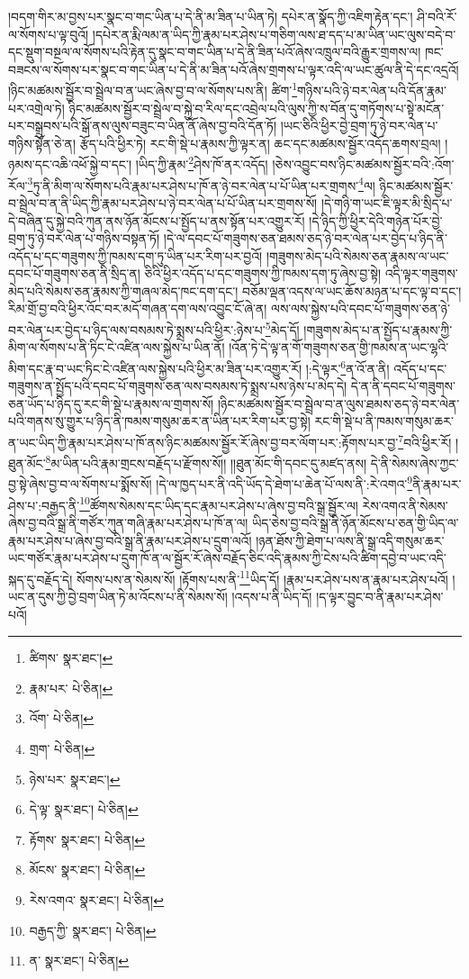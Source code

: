 །བདག་གིར་མ་བྱས་པར་སྣང་བ་གང་ཡིན་པ་དེ་ནི་མ་ཟིན་པ་ཡིན་ཏེ། དཔེར་ན་སྣོད་ཀྱི་འཇིག་རྟེན་དང་། ཤི་བའི་རོ་ལ་སོགས་པ་ལྟ་བུའོ། །དཔེར་ན་རྨི་ལམ་ན་ཡིད་ཀྱི་རྣམ་པར་ཤེས་པ་གཅིག་ལས་ཐ་དད་པ་མ་ཡིན་ཡང་ལུས་བདེ་བ་དང་སྡུག་བསྔལ་ལ་སོགས་པའི་རྟེན་དུ་སྣང་བ་གང་ཡིན་པ་དེ་ནི་ཟིན་པའོ་ཞེས་འཁྲུལ་བའི་རྒྱུར་གྲགས་ལ། ཁང་བཟངས་ལ་སོགས་པར་སྣང་བ་གང་ཡིན་པ་དེ་ནི་མ་ཟིན་པའོ་ཞེས་གྲགས་པ་ལྟར་འདི་ལ་ཡང་ཚུལ་ནི་དེ་དང་འདྲའོ། །ཉིང་མཚམས་སྦྱོར་བ་སྦྲེལ་བ་ན་ཡང་ཞེས་བྱ་བ་ལ་སོགས་པས་ནི། ཚིག་\footnote{ཚིགས་  སྣར་ཐང་། }གཉིས་པའི་ཉེ་བར་ལེན་པའི་དོན་རྣམ་པར་འགྲེལ་ཏེ། ཉིང་མཚམས་སྦྱོར་བ་སྦྲེལ་བ་སྐྱེ་བ་རིལ་དང་འབྲེལ་པའི་ལུས་ཀྱི་ས་བོན་དུ་གཏོགས་པ་སྟེ་མངོན་པར་བསྒྲུབས་པའི་སྒོ་ནས་ལུས་བཟུང་བ་ཡིན་ནོ་ཞེས་བྱ་བའི་དོན་ཏོ། །ཡང་ཅིའི་ཕྱིར་བྱེ་བྲག་ཏུ་ཉེ་བར་ལེན་པ་གཉིས་སྟོན་ཅེ་ན། རྩོད་པའི་ཕྱིར་ཏེ། རང་གི་སྡེ་པ་རྣམས་ཀྱི་ལྟར་ན། ཆང་དང་མཚམས་སྦྱོར་འདོད་ཆགས་བྲལ། །ཉམས་དང་འཆི་འཕོ་སྐྱེ་བ་དང་། །ཡིད་ཀྱི་རྣམ་\footnote{རྣམ་པར་  པེ་ཅིན། }ཤེས་ཁོ་ནར་འདོད། །ཅེས་འབྱུང་བས་ཉིང་མཚམས་སྦྱོར་བའི་:འོག་རོལ་\footnote{འོག་  པེ་ཅིན། }ཏུ་ནི་མིག་ལ་སོགས་པའི་རྣམ་པར་ཤེས་པ་ཁོ་ན་ཉེ་བར་ལེན་པ་པོ་ཡིན་པར་གྲགས་\footnote{གྲག་  པེ་ཅིན། }ལ། ཉིང་མཚམས་སྦྱོར་བ་སྦྲེལ་བ་ན་ནི་ཡིད་ཀྱི་རྣམ་པར་ཤེས་པ་ཉེ་བར་ལེན་པ་པོ་ཡིན་པར་གྲགས་སོ། །དེ་གཉི་ག་ཡང་ཇི་ལྟར་མི་སྲིད་པ་དེ་བཞིན་དུ་སྐྱེ་བའི་ཀུན་ནས་ཉོན་མོངས་པ་སྤྱོད་པ་ནས་སྟོན་པར་འགྱུར་རོ། །དེ་ཉིད་ཀྱི་ཕྱིར་དེའི་གཉེན་པོར་བྱེ་བྲག་ཏུ་ཉེ་བར་ལེན་པ་གཉིས་བསྟན་ཏོ། །དེ་ལ་དབང་པོ་གཟུགས་ཅན་ཐམས་ཅད་ཉེ་བར་ལེན་པར་བྱེད་པ་ཉིད་ནི་འདོད་པ་དང་གཟུགས་ཀྱི་ཁམས་དག་ཏུ་ཡིན་པར་རིག་པར་བྱའོ། །གཟུགས་མེད་པའི་སེམས་ཅན་རྣམས་ལ་ཡང་དབང་པོ་གཟུགས་ཅན་ནི་སྲིད་ན། ཅིའི་ཕྱིར་འདོད་པ་དང་གཟུགས་ཀྱི་ཁམས་དག་ཏུ་ཞེས་བྱ་སྟེ། འདི་ལྟར་གཟུགས་མེད་པའི་སེམས་ཅན་རྣམས་ཀྱི་གཞལ་མེད་ཁང་དག་དང་། བཅོམ་ལྡན་འདས་ལ་ཡང་ཆོས་མཉན་པ་དང་ལྟ་བ་དང་། རིམ་གྲོ་བྱ་བའི་ཕྱིར་འོང་བར་མདོ་གཞན་དག་ལས་འབྱུང་ངོ་ཞེ་ན། ལས་ལས་སྐྱེས་པའི་དབང་པོ་གཟུགས་ཅན་ཉེ་བར་ལེན་པར་བྱེད་པ་ཉིད་ལས་བསམས་ཏེ་སྨྲས་པའི་ཕྱིར་:ཉེས་པ་\footnote{ཉེས་པར་  སྣར་ཐང་། }མེད་དོ། །གཟུགས་མེད་པ་ན་སྤྱོད་པ་རྣམས་ཀྱི་མིག་ལ་སོགས་པ་ནི་ཏིང་ངེ་འཛིན་ལས་སྐྱེས་པ་ཡིན་ནོ། །འོན་ཏེ་དེ་ལྟ་ན་གོ་གཟུགས་ཅན་གྱི་ཁམས་ན་ཡང་ལྷའི་མིག་དང་རྣ་བ་ཡང་ཏིང་ངེ་འཛིན་ལས་སྐྱེས་པའི་ཕྱིར་མ་ཟིན་པར་འགྱུར་རོ། །:དེ་ལྟར་\footnote{དེ་ལྟ་  སྣར་ཐང་།  པེ་ཅིན། }ན་འོ་ན་ནི། འདོད་པ་དང་གཟུགས་ན་སྤྱོད་པའི་དབང་པོ་གཟུགས་ཅན་ལས་བསམས་ཏེ་སྨྲས་པས་ཉེས་པ་མེད་དེ། དེ་ན་ནི་དབང་པོ་གཟུགས་ཅན་ཡོད་པ་ཉིད་དུ་རང་གི་སྡེ་པ་རྣམས་ལ་གྲགས་སོ། །ཉིང་མཚམས་སྦྱོར་བ་སྦྲེལ་བ་ན་ལུས་ཐམས་ཅད་ཉེ་བར་ལེན་པའི་གནས་སུ་གྱུར་པ་ཉིད་ནི་ཁམས་གསུམ་ཆར་ན་ཡིན་པར་རིག་པར་བྱ་སྟེ། རང་གི་སྡེ་པ་ནི་ཁམས་གསུམ་ཆར་ན་ཡང་ཡིད་ཀྱི་རྣམ་པར་ཤེས་པ་ཁོ་ནས་ཉིང་མཚམས་སྦྱོར་རོ་ཞེས་བྱ་བར་ལོག་པར་:རྟོགས་པར་བྱ་\footnote{རྟོགས་  སྣར་ཐང་།  པེ་ཅིན། }བའི་ཕྱིར་རོ། །ཐུན་མོང་\footnote{མོངས་  སྣར་ཐང་།  པེ་ཅིན། }མ་ཡིན་པའི་རྣམ་གྲངས་བརྗོད་པ་རྫོགས་སོ།། །།ཐུན་མོང་གི་དབང་དུ་མཛད་ནས། དེ་ནི་སེམས་ཞེས་ཀྱང་བྱ་སྟེ་ཞེས་བྱ་བ་ལ་སོགས་པ་སྨོས་སོ། །དེ་ལ་ཁྱད་པར་ནི་འདི་ཡོད་དེ་ཐེག་པ་ཆེན་པོ་ལས་ནི་:རེ་འགའ་\footnote{རེས་འགའ་  སྣར་ཐང་།  པེ་ཅིན། }ནི་རྣམ་པར་ཤེས་པ་:བརྒྱད་ནི་\footnote{བརྒྱད་ཀྱི་  སྣར་ཐང་།  པེ་ཅིན། }ཚོགས་སེམས་དང་ཡིད་དང་རྣམ་པར་ཤེས་པ་ཞེས་བྱ་བའི་སྒྲ་སྦྱོར་ལ། རེས་འགའ་ནི་སེམས་ཞེས་བྱ་བའི་སྒྲ་ནི་གཙོར་ཀུན་གཞི་རྣམ་པར་ཤེས་པ་ཁོ་ན་ལ། ཡིད་ཅེས་བྱ་བའི་སྒྲ་ནི་ཉོན་མོངས་པ་ཅན་གྱི་ཡིད་ལ་རྣམ་པར་ཤེས་པ་ཞེས་བྱ་བའི་སྒྲ་ནི་རྣམ་པར་ཤེས་པ་དྲུག་ལའོ། །ཉན་ཐོས་ཀྱི་ཐེག་པ་ལས་ནི་སྒྲ་འདི་གསུམ་ཆར་ཡང་གཙོར་རྣམ་པར་ཤེས་པ་དྲུག་ཁོ་ན་ལ་སྦྱོར་རོ་ཞེས་བརྗོད་ཅིང་འདི་རྣམས་ཀྱི་ངེས་པའི་ཚིག་དབྱེ་བ་ཡང་འདི་སྐད་དུ་བརྗོད་དེ། སོགས་པས་ན་སེམས་སོ། །རྟོགས་པས་ནི་\footnote{ན་  སྣར་ཐང་།  པེ་ཅིན། }ཡིད་དོ། །རྣམ་པར་ཤེས་པས་ན་རྣམ་པར་ཤེས་པའོ། །ཡང་ན་དུས་ཀྱི་བྱེ་བྲག་ཡིན་ཏེ་མ་འོངས་པ་ནི་སེམས་སོ། །འདས་པ་ནི་ཡིད་དོ། །ད་ལྟར་བྱུང་བ་ནི་རྣམ་པར་ཤེས་པའོ། 